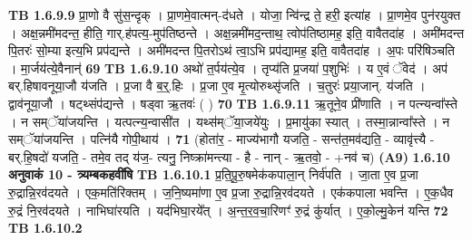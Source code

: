 \documentclass[17pt]{extarticle}
\begin{document}
                  \newline
                                \textbf{ TB 1.6.9.9} \newline
                  प्रा॒णो वै सु॑स॒न्दृक् । प्रा॒णमे॒वात्मन्-द॑धते । योजा॒ न्वि॑न्द्र ते॒ हरी॒ इत्या॑ह । प्रा॒णमे॒व पुन॑रयुक्त । अक्ष॒न्नमी॑मदन्त॒ हीति॒ गार्.ह॑पत्य॒-मुप॑तिष्ठन्ते । अक्ष॒न्नमी॑मद॒न्ताथ॒ त्वोप॑तिष्ठामह॒ इति॒ वावैतदा॑ह । अमी॑मदन्त पि॒तरः॑ सो॒म्या इत्य॒भि प्रप॑द्यन्ते । अमी॑मदन्त पि॒तरोऽथ॑ त्वा॒ऽभि प्रप॑द्यामह॒ इति॒ वावैतदा॑ह । अ॒पः परि॑षिञ्चति । मा॒र्जय॑त्ये॒वैनान्॑ \textbf{ 69} \newline
                  \newline
                                \textbf{ TB 1.6.9.10} \newline
                  अथो॑ त॒र्पय॑त्ये॒व । तृप्य॑ति प्र॒जया॑ प॒शुभिः॑ । य ए॒वं ॅवेद॑ । अप॑ बर्.हिषावनूया॒जौ य॑जति । प्र॒जा वै ब॒र्॒.हिः । प्र॒जा ए॒व मृ॒त्योरुथ्सृ॑जति । च॒तुरः॑ प्रया॒जान्. य॑जति । द्वाव॑नूया॒जौ । षट्थ्संप॑द्यन्ते । षड्वा ऋ॒तवः॑ ( ) \textbf{ 70} \newline
                  \newline
                                \textbf{ TB 1.6.9.11} \newline
                  ऋ॒तूने॒व प्री॑णाति । न पत्न्यन्वा᳚स्ते । न सम्ॅया॑जयन्ति । यत्पत्न्य॒न्वासी॑त । यथ्स॑म्ॅया॒जये॑युः । प्र॒मायु॑का स्यात् । तस्मा॒न्नान्वा᳚स्ते । न सम्ॅया॑जयन्ति । पत्नि॑यै गोपी॒थाय॑ । \textbf{ 71} \newline
                  \newline
                                    (होता॑र॒ - माज्य॑भागौ यजति॒ - सन्त॑त॒मव॑द्यति॒ - व्यावृ॑त्त्यै - बर्.हि॒षदो॑ यजति॒ - तमे॒व तद् य॑ज॒- त्यनु॒ निष्क्रा॑मन्त्या - है - नान् - ऋ॒तवो॒ - +नव॑ च) \textbf{(A9)} \newline \newline
                \textbf{ 1.6.10    अनुवाकं   10 - त्र्यम्बकहवींषि} \newline
                                \textbf{ TB 1.6.10.1} \newline
                  प्र॒ति॒पू॒रु॒षमेक॑कपाला॒न् निर्व॑पति । जा॒ता ए॒व प्र॒जा रु॒द्रान्नि॒रव॑दयते । एक॒मति॑रिक्तम् । ज॒नि॒ष्यमा॑णा ए॒व प्र॒जा रु॒द्रान्नि॒रव॑दयते । एक॑कपाला भवन्ति । ए॒क॒धैव रु॒द्रं नि॒रव॑दयते । नाभिघा॑रयति । यद॑भिघा॒रये᳚त् । अ॒न्त॒र॒व॒चा॒रिणꣳ॑ रु॒द्रं कु॑र्यात् । ए॒को॒ल्मु॒केन॑ यन्ति \textbf{ 72} \newline
                  \newline
                                \textbf{ TB 1.6.10.2} \newline
\end{document}
